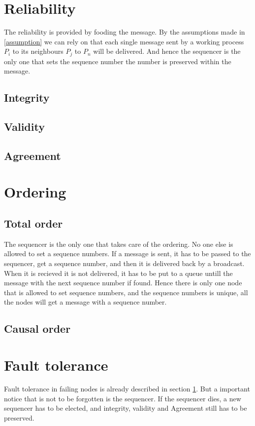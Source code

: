 \documentclass{article}
\begin{document}
\section{Reliability}
  \label{reliability}
  The reliability is provided by fooding the message. By the assumptions made in \ref{assumption} we can rely on 
  that each single message sent by a working process $P_i$ to its neighbours $P_j$ to $P_n$ will be delivered.
  And hence the sequencer is the only one that sets the sequence number the number is preserved within the message.
\subsection{Integrity}
\subsection{Validity}
\subsection{Agreement}
\section{Ordering}
\subsection{Total order}
  The sequencer is the only one that takes care of the ordering. No one else is allowed to set a sequence numbers.
  If a message is sent, it has to be passed to the sequencer, get a sequence number, and then it is delivered back
  by a broadcast. When it is recieved it is not delivered, it has to be put to a queue untill the message with the
  next sequence number if found. Hence there is only one node that is allowed to set sequence numbers, and the 
  sequence numbers is unique, all the nodes will get a message with a sequence number.
\subsection{Causal order}
\section{Fault tolerance}
  Fault tolerance in failing nodes is already described in section \ref{reliability}.
  But a important notice that is not to be forgotten is the sequencer. If the sequencer dies, a new sequencer
  has to be elected, and integrity, validity and Agreement still has to be preserved.
 
\end{document}

